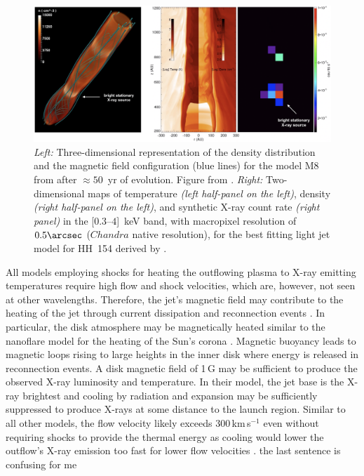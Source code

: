 \begin{figure}[t]
    \centering
    \includegraphics[width=12cm]{figs/ustamujic.png}
    \caption{\emph{Left:} Three-dimensional representation of the density distribution and the magnetic field configuration (blue lines) 
    for the model M8 from \cite{Ustamujic_2016} after $\approx 50$~yr 
    of evolution. Figure from \cite{Ustamujic_2016}.
    \emph{Right:} Two-dimensional maps of temperature \emph{(left half-panel on 
    the left)}, density \emph{(right half-panel on the left)}, and synthetic 
    X-ray count rate \emph{(right panel)} in the [$0.3–4$]~keV band, with 
    macropixel resolution of $0.5\arcsec$ ($Chandra$  native resolution),
    for the best fitting light jet model for HH~154 derived
    by \cite{Ustamujic_2018}.}
    \label{fig:ustamujic}
\end{figure}



All models employing shocks for heating the outflowing plasma to X-ray emitting temperatures require high flow and shock velocities, which are, however, not seen at other wavelengths. Therefore, the jet's magnetic field may contribute to the heating of the jet through current dissipation and reconnection events \cite{Guedel_2007, Schneider_2013a}.
In particular, the disk atmosphere may be magnetically heated similar to the nanoflare model for the heating of the Sun's corona \cite{Takasao_2017}. Magnetic buoyancy leads to magnetic loops rising to large heights in the inner disk where energy is released in reconnection events. A disk magnetic field of 1\,G may be sufficient to produce the observed X-ray luminosity and temperature. In their model, the jet base is the X-ray brightest and cooling by radiation and expansion may be sufficiently suppressed to produce X-rays at some distance to the launch region. Similar to all other models, the flow velocity likely exceeds 300\,km\,s$^{-1}$ even without requiring shocks to provide the thermal energy as cooling would lower the outflow's X-ray emission too fast for lower flow velocities \cite{Takasao_2017}. {\color{red} the last sentence is confusing for me}

